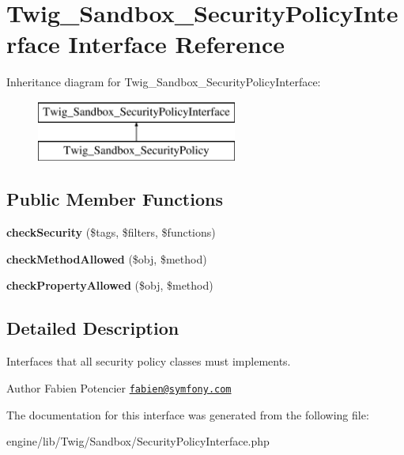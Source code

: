 \hypertarget{interface_twig___sandbox___security_policy_interface}{}\section{Twig\+\_\+\+Sandbox\+\_\+\+Security\+Policy\+Interface Interface Reference}
\label{interface_twig___sandbox___security_policy_interface}
Inheritance diagram for Twig\+\_\+\+Sandbox\+\_\+\+Security\+Policy\+Interface\+:\begin{figure}[H]
\begin{center}
\leavevmode
\includegraphics[height=2.000000cm]{interface_twig___sandbox___security_policy_interface}
\end{center}
\end{figure}
\subsection*{Public Member Functions}
\begin{DoxyCompactItemize}
\item 
\hypertarget{interface_twig___sandbox___security_policy_interface_a0cc084f6abef1e1ba223ddd057ddcd2b}{}{\bfseries check\+Security} (\$tags, \$filters, \$functions)\label{interface_twig___sandbox___security_policy_interface_a0cc084f6abef1e1ba223ddd057ddcd2b}

\item 
\hypertarget{interface_twig___sandbox___security_policy_interface_a90633d7d23e0b157387b886a8ef87a36}{}{\bfseries check\+Method\+Allowed} (\$obj, \$method)\label{interface_twig___sandbox___security_policy_interface_a90633d7d23e0b157387b886a8ef87a36}

\item 
\hypertarget{interface_twig___sandbox___security_policy_interface_a7dda78b41e8686064b990bb425d24700}{}{\bfseries check\+Property\+Allowed} (\$obj, \$method)\label{interface_twig___sandbox___security_policy_interface_a7dda78b41e8686064b990bb425d24700}

\end{DoxyCompactItemize}


\subsection{Detailed Description}
Interfaces that all security policy classes must implements.

\begin{DoxyAuthor}{Author}
Fabien Potencier \href{mailto:fabien@symfony.com}{\tt fabien@symfony.\+com} 
\end{DoxyAuthor}


The documentation for this interface was generated from the following file\+:\begin{DoxyCompactItemize}
\item 
engine/lib/\+Twig/\+Sandbox/Security\+Policy\+Interface.\+php\end{DoxyCompactItemize}
